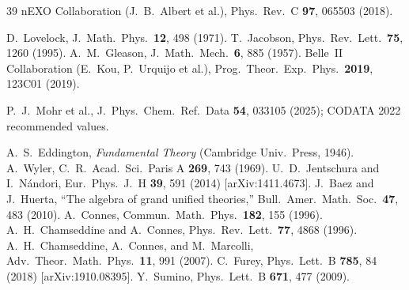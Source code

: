 \documentclass[fontsize=11pt,paper=a4,lualatex]{jlreq}
\begin{document}
\begin{thebibliography}{39}
 nEXO Collaboration (J.~B.~Albert et al.),
  Phys.\ Rev.\ C \textbf{97}, 065503 (2018).

 D.~Lovelock, J.\ Math.\ Phys.\ \textbf{12}, 498 (1971).
 T.~Jacobson, Phys.\ Rev.\ Lett.\ \textbf{75}, 1260 (1995).
 A.~M.~Gleason, J.\ Math.\ Mech.\ \textbf{6}, 885 (1957).
 Belle~II Collaboration (E.~Kou, P.~Urquijo et al.),
  Prog.\ Theor.\ Exp.\ Phys.\ \textbf{2019}, 123C01 (2019).



 P.~J.~Mohr et al.,
  J.\ Phys.\ Chem.\ Ref.\ Data \textbf{54}, 033105 (2025);
  CODATA 2022 recommended values.

 A.~S.~Eddington, \textit{Fundamental Theory} (Cambridge Univ.\ Press, 1946).
 A.~Wyler, C.\ R.\ Acad.\ Sci.\ Paris A \textbf{269}, 743 (1969).
 U.~D.~Jentschura and I.~N\'andori, Eur.\ Phys.\ J.\ H \textbf{39}, 591 (2014) [arXiv:1411.4673].
 J.~Baez and J.~Huerta, ``The algebra of grand unified theories,'' Bull.\ Amer.\ Math.\ Soc.\ \textbf{47}, 483 (2010).
 A.~Connes, Commun.\ Math.\ Phys.\ \textbf{182}, 155 (1996).
 A.~H.~Chamseddine and A.~Connes, Phys.\ Rev.\ Lett.\ \textbf{77}, 4868 (1996).
 A.~H.~Chamseddine, A.~Connes, and M.~Marcolli, Adv.\ Theor.\ Math.\ Phys.\ \textbf{11}, 991 (2007).
 C.~Furey, Phys.\ Lett.\ B \textbf{785}, 84 (2018) [arXiv:1910.08395].
 Y.~Sumino, Phys.\ Lett.\ B \textbf{671}, 477 (2009).

\end{thebibliography}
\end{document}
